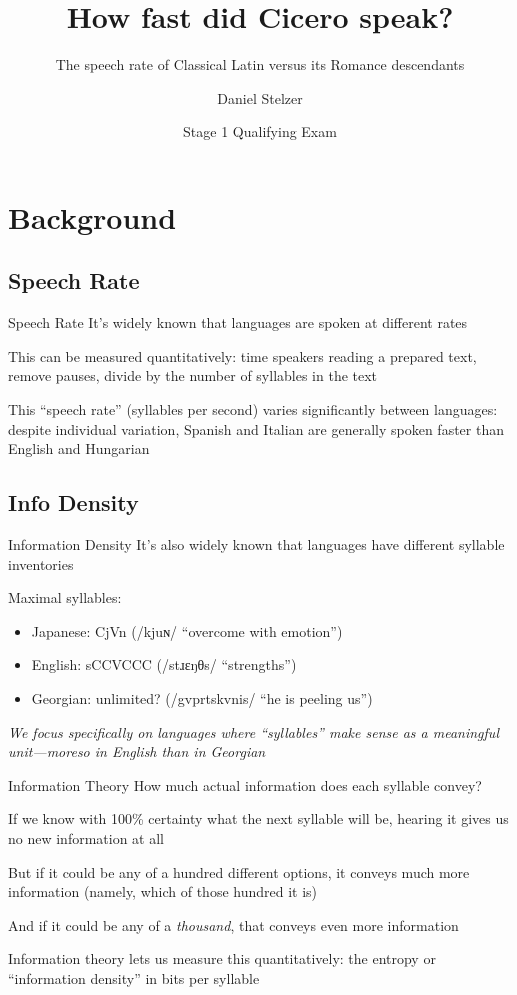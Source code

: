 \documentclass{beamer}
\title{How fast did Cicero speak?} \subtitle{The speech rate of Classical Latin versus its Romance descendants}
\author{Daniel Stelzer}
\institute{University of Illinois at Urbana-Champaign}
\date{Stage 1 Qualifying Exam}
\DeclareRobustCommand\ipa[1]{{\ipafamily/#1/}}
\begin{document}
\frame{\titlepage}

\section{Background}

\subsection{Speech Rate}

\begin{frame}{Speech Rate}
It's widely known that languages are spoken at different rates

This can be measured quantitatively: time speakers reading a prepared text, remove pauses, divide by the number of syllables in the text

This ``speech rate'' (syllables per second) varies significantly between languages: despite individual variation, Spanish and Italian are generally spoken faster than English and Hungarian
\end{frame}

\subsection{Info Density}

\begin{frame}{Information Density}
It's also widely known that languages have different syllable inventories

Maximal syllables:
\vspace{-1em}
\begin{itemize}
    \item Japanese: CjVn (\ipa{kjuɴ} ``overcome with emotion'')
    \item English: sCCVCCC (\ipa{stɹɛŋθs} ``strengths'')
    \item Georgian: unlimited? (\ipa{gvprtskvnis} ``he is peeling us'')
\end{itemize}

\emph{We focus specifically on languages where ``syllables'' make sense as a meaningful unit---moreso in English than in Georgian}
\end{frame}

\begin{frame}{Information Theory}
How much actual information does each syllable convey?

If we know with 100\% certainty what the next syllable will be, hearing it gives us no new information at all

But if it could be any of a hundred different options, it conveys much more information (namely, which of those hundred it is)

And if it could be any of a \emph{thousand}, that conveys even more information

Information theory lets us measure this quantitatively: the entropy or ``information density'' in bits per syllable
\end{frame}
\end{document}
